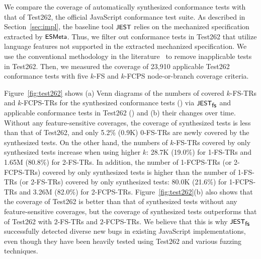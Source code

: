 
We compare the coverage of automatically synthesized conformance tests with that
of Test262, the official JavaScript conformance test suite.
As described in Section~\ref{sec:impl}, the baseline tool $\textsf{\small JEST}$ relies on the
mechanized specification extracted by $\textsf{\small ESMeta}$.
Thus, we filter out conformance tests in Test262 that utilize language
features not supported in the extracted mechanized specification.
We use the conventional methodology in the literature~\cite{kjs, jiset, javert}
to remove inapplicable tests in Test262.
Then, we measured the coverage of 23,910 applicable Test262 conformance tests
with five $k$-FS and $k$-FCPS node-or-branch coverage criteria.


Figure~\ref{fig:test262} shows
(a) Venn diagrams of
the numbers of covered $k$-FS-TRs and 
$k$-FCPS-TRs for the synthesized conformance tests () via
$\textsf{\small JEST}_{\textsf{\small fs}}$ and applicable conformance tests in Test262 () and
(b) their changes over time.
Without any feature-sensitive coverages, the coverage of synthesized tests is
less than that of Test262, and only 5.2\% (0.9K) 0-FS-TRs are newly covered by
the synthesized tests.
%
On the other hand, the numbers of $k$-FS-TRs covered by only synthesized tests
increase when using higher $k$: 28.7K (19.0\%) for 1-FS-TRs and 1.65M (80.8\%)
for 2-FS-TRs.
%
In addition, the number of 1-FCPS-TRs (or 2-FCPS-TRs) covered by only
synthesized tests is higher than the number of 1-FS-TRs (or 2-FS-TRs)
covered by only synthesized tests:
80.0K (21.6\%) for 1-FCPS-TRs and 3.26M (82.0\%) for 2-FCPS-TRs.
Figure~\ref{fig:test262}(b) also shows that the coverage of Test262 is
better than that of synthesized tests without any feature-sensitive
coverages, but the coverage of synthesized tests outperforms that of
Test262 with $2$-FS-TRs and $2$-FCPS-TRs.
%
We believe that this is why $\textsf{\small JEST}_{\textsf{\small fs}}$ successfully detected diverse new bugs in
existing JavaScript implementations, even though they have been heavily tested
using Test262 and various fuzzing techniques.
